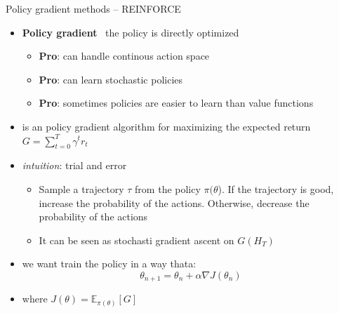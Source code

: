 \documentclass[presentation, 9pt]{beamer}\mode<presentation>{\usetheme{AMSBolognaFC}}
\begin{document}
\begin{frame}{Policy gradient methods -- REINFORCE}
	\begin{itemize}
		\item \textbf{Policy gradient} \faArrowRight \, the policy is directly optimized
		\begin{itemize}
			\item \textbf{Pro}: can handle continous action space
			\item \textbf{Pro}: can learn stochastic policies
			\item \textbf{Pro}: sometimes policies are easier to learn than value functions
		\end{itemize}
		\item {} is an policy gradient algorithm for maximizing the expected return $G = \sum_{t=0}^T \gamma^t r_t$
		\item \emph{intuition}: trial and error
		\begin{itemize}
			\item Sample a trajectory $\tau$ from the policy $\pi(\theta$). If the trajectory is good, increase the probability of the actions. Otherwise, decrease the probability of the actions
			\item It can be seen as stochasti gradient ascent on $G(H_T)$
		\end{itemize}
		\item we want train the policy in a way thata:
		\begin{equation*}
			\theta_{n+1} = \theta_{n} + \alpha \nabla J(\theta_n)
		\end{equation*}
		\item where $J(\theta) = \mathbb{E}_{\pi(\theta)}[G]$
	\end{itemize}
\end{frame}	
\end{document}
